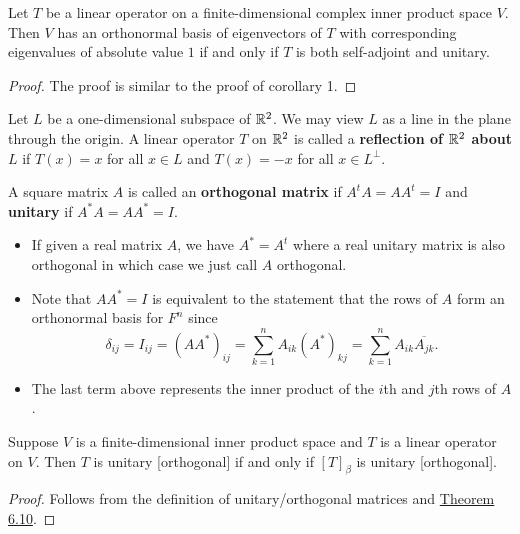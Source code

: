 \begin{corollary}
    Let \( T  \) be a linear operator on a finite-dimensional complex inner product space \( V  \). Then \( V  \) has an orthonormal basis of eigenvectors of \( T  \) with corresponding eigenvalues of absolute value \( 1  \) if and only if \( T  \) is both self-adjoint and unitary.
\end{corollary}

\begin{proof}
    The proof is similar to the proof of corollary 1.
\end{proof}

\begin{definition}
    Let \( L  \) be a one-dimensional subspace of \( \mathbb{R}^{2} \). We may view \( L  \) as a line in the plane through the origin. A linear operator \( T  \) on \( \mathbb{R}^{2} \) is called a \textbf{reflection of \( \mathbb{R}^{2} \) about \( L  \)} if \( T(x) = x  \) for all \( x \in L  \) and \( T(x) = -x  \) for all \( x \in L^{\perp} \).
\end{definition}

\begin{definition}
    A square matrix \( A  \) is called an \textbf{orthogonal matrix} if \( A^{t} A = A A^{t} = I  \) and \textbf{unitary} if \( A^{*} A = A A^{*} = I  \).
\end{definition}

\begin{itemize}
    \item If given a real matrix \( A  \), we have \( A^{*} = A^{t} \) where a real unitary matrix is also orthogonal in which case we just call \( A  \) orthogonal.
    \item Note that \( A A^{*} = I  \) is equivalent to the statement that the rows of \( A  \) form an orthonormal basis for \( F^{n} \) since
        \[  {\delta}_{ij} = {I}_{ij} = (AA^{*})_{ij} = \sum_{ k=1  }^{ n } {A}_{ik } {(A^{*})}_{kj} = \sum_{ k=1  }^{ n } {A}_{ik} \overline{{A}_{jk}}. \]
    \item The last term above represents the inner product of the \( i \)th and \( j \)th rows of \( A  \).
\end{itemize}

\begin{prop}
    Suppose \( V  \) is a finite-dimensional inner product space and \( T  \) is a linear operator on \( V  \). Then \( T  \) is unitary [orthogonal] if and only if \( [T]_{\beta} \) is unitary [orthogonal]. 
\end{prop}
\begin{proof}
    Follows from the definition of unitary/orthogonal matrices and {\hyperref[Theorem 6.10]{Theorem 6.10}}.
\end{proof}
